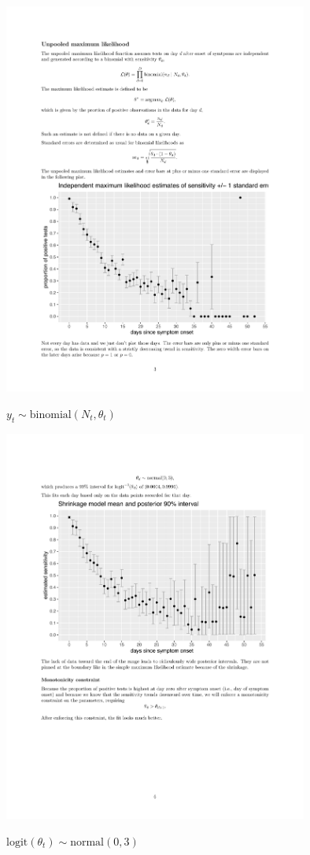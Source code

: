\documentclass[9pt]{report}
\begin{document}
\includegraphics[width=0.75\textwidth]{img/mle-time-series.pdf}
\vspace*{-3pt}
\begin{subitemize}
  \item $y_t \sim \textrm{binomial}(N_t, \theta_t)$
  \end{subitemize}
  

\includegraphics[width=0.75\textwidth]{img/bayes-90pct-shrinkage.pdf}
\vspace*{-3pt}
\begin{subitemize}
\item $\textrm{logit}(\theta_t) \sim \textrm{normal}(0, 3)$
\end{subitemize}
\end{document}
